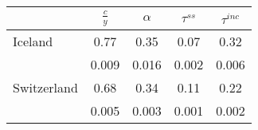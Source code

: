 \begin{tabular}{lcccc}
& \multicolumn{1}{c}{$\displaystyle \frac{c}{y}$}
& \multicolumn{1}{c}{$\alpha$}
& \multicolumn{1}{c}{$\tau^{ss}$}
& \multicolumn{1}{c}{$\tau^{inc}$} \\[1em]
\hline
\hline
Iceland     & 0.77       & 0.35        & 0.07          & 0.32     \\
            & 0.009      & 0.016       & 0.002         & 0.006     \\
Switzerland     & 0.68       & 0.34        & 0.11          & 0.22     \\
            & 0.005      & 0.003       & 0.001         & 0.002     \\
\hline
\end{tabular}
